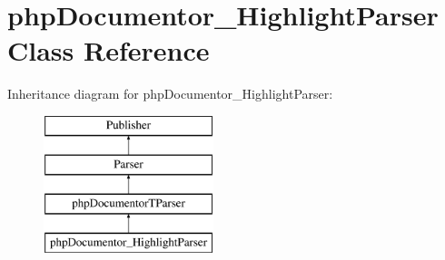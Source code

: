 \hypertarget{classphp_documentor___highlight_parser}{\section{php\-Documentor\-\_\-\-Highlight\-Parser \-Class \-Reference}
\label{classphp_documentor___highlight_parser}
}
\-Inheritance diagram for php\-Documentor\-\_\-\-Highlight\-Parser\-:\begin{figure}[H]
\begin{center}
\leavevmode
\includegraphics[height=4.000000cm]{classphp_documentor___highlight_parser}
\end{center}
\end{figure}
